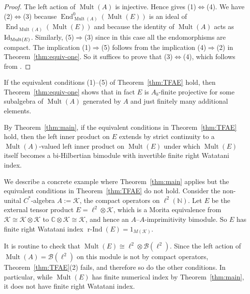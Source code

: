 \documentclass[10pt,a4paper]{amsart}
\numberwithin{equation}{section}
\DeclareMathOperator{\End}{End} %
\DeclareMathOperator{\Mult}{Mult} %
\newcommand{\rInd}{\operatorname{\mbox{$r$-$\operatorname{Ind}$}}}
\newcommand{\C}{\mathbb{C}} %
\newcommand{\K}{\mathcal{K}} %
\newcommand{\N}{\mathbb{N}} %
\begin{document}
\begin{proof} The left action of $\Mult(A)$ is injective. Hence \cite[Corollaries~2.20 and~2.28]{KajPinWat} gives \mbox{(1)\;$\Leftrightarrow$\;(4)}. We have
\mbox{(2)\;$\Leftrightarrow$\;(3)} because $\End_{\Mult(A)}^0(\Mult(E))$ is an ideal of $\End_{\Mult(A)}(\Mult(E))$ and because the identity of $\Mult(A)$ acts as ${\rm Id}_{\Mult(E)}$. Similarly, \mbox{(5)\;$\Rightarrow$\;(3)} since in this case all the endomorphisms are compact. The implication \mbox{(1)\;$\Rightarrow$\;(5)} follows from the implication \mbox{(4)\;$\Rightarrow$\;(2)} in Theorem~\ref{thm:equiv-one}. So it suf\/f\/ices to prove that \mbox{(3)\;$\Leftrightarrow$\;(4)}, which follows from \cite[Theorem~2.22]{KajPinWat}.
\end{proof}

\begin{rmk}If the equivalent conditions (1)--(5) of Theorem~\ref{thm:TFAE} hold, then Theorem~\ref{thm:equiv-one} shows that in fact $E$ is $A_b$-f\/inite projective for some subalgebra of $\Mult(A)$ generated by $A$ and just f\/initely many additional elements.
\end{rmk}

\begin{rmk} By Theorem~\ref{thm:main}, if the equivalent conditions in Theorem~\ref{thm:TFAE} hold, then the left inner product on $E$ extends by strict continuity to a $\Mult(A)$-valued left inner product on $\Mult(E)$ under which $\Mult(E)$ itself becomes a bi-Hilbertian bimodule with invertible f\/inite right Watatani index.
\end{rmk}

\begin{Example}We describe a concrete example where Theorem~\ref{thm:main} applies but the equivalent conditions in Theorem~\ref{thm:TFAE} do not hold. Consider the non-unital $C^*$-algebra $A := \K$, the compact operators on $\ell^2(\N)$. Let $E$ be the external tensor product $E = \ell^2 \otimes \K$, which is a Morita equivalence from $\K \cong \K \otimes \K$ to $\C \otimes \K \cong \K$, and hence an $A$--$A$-imprimitivity bimodule. So $E$ has f\/inite right Watatani index $\rInd(E) = 1_{M(\K)}$.

It is routine to check that $\Mult(E) \cong \ell^2 \otimes \mathcal{B}(\ell^2)$. Since the left action of $\Mult(A) = \mathcal{B}(\ell^2)$ on this module is not by compact operators, Theo\-rem~\ref{thm:TFAE}(2) fails, and therefore so do the other conditions. In particular, while $\Mult(E)$ has f\/inite numerical index by Theorem~\ref{thm:main}, it does not have f\/inite right Watatani index.
\end{Example}
\end{document}
